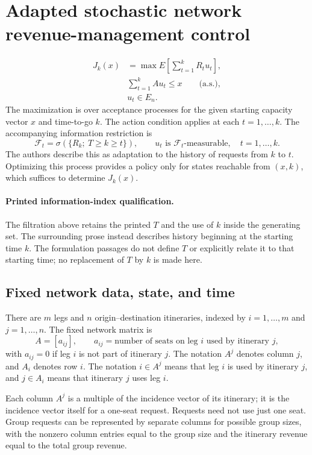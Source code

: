 \documentclass{article}
\begin{document}
\section*{Adapted stochastic network revenue-management control}

\begin{equation}
\begin{aligned}
J_k(x)&=\max E\left[\sum_{t=1}^{k}R_tu_t\right],\\
&\sum_{t=1}^{k}Au_t\leq x\qquad\text{(a.s.)},\\
&u_t\in E_n.
\end{aligned}\tag{6}
\end{equation}
The maximization is over acceptance processes for the given starting capacity vector $x$ and time-to-go $k$. The action condition applies at each $t=1,\ldots,k$. The accompanying information restriction is
\[
\mathcal{F}_t=\sigma(\{R_k;\ T\geq k\geq t\}),
\qquad
u_t\text{ is }\mathcal{F}_t\text{-measurable},\quad t=1,\ldots,k.
\]
The authors describe this as adaptation to the history of requests from $k$ to $t$. Optimizing this process provides a policy only for states reachable from $(x,k)$, which suffices to determine $J_k(x)$.

\paragraph{Printed information-index qualification.}
The filtration above retains the printed $T$ and the use of $k$ inside the generating set. The surrounding prose instead describes history beginning at the starting time $k$. The formulation passages do not define $T$ or explicitly relate it to that starting time; no replacement of $T$ by $k$ is made here.

\subsection*{Fixed network data, state, and time}
There are $m$ legs and $n$ origin--destination itineraries, indexed by $i=1,\ldots,m$ and $j=1,\ldots,n$. The fixed network matrix is
\[
A=[a_{ij}],\qquad
 a_{ij}=\text{number of seats on leg }i\text{ used by itinerary }j,
\]
with $a_{ij}=0$ if leg $i$ is not part of itinerary $j$. The notation $A^j$ denotes column $j$, and $A_i$ denotes row $i$. The notation $i\in A^j$ means that leg $i$ is used by itinerary $j$, and $j\in A_i$ means that itinerary $j$ uses leg $i$.

Each column $A^j$ is a multiple of the incidence vector of its itinerary; it is the incidence vector itself for a one-seat request. Requests need not use just one seat. Group requests can be represented by separate columns for possible group sizes, with the nonzero column entries equal to the group size and the itinerary revenue equal to the total group revenue.
\end{document}
